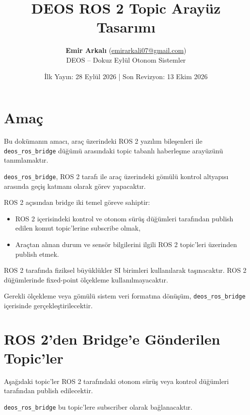 \documentclass[12pt,a4paper]{article}
\title{
    \textbf{DEOS ROS 2 Topic Arayüz Tasarımı}
}
\author{\textbf{Emir Arkalı} (\href{mailto:emirarkali07@gmail.com}{emirarkali07@gmail.com})\\DEOS -- Dokuz Eylül Otonom Sistemler}
\date{İlk Yayın: 28 Eylül 2026 \quad | \quad Son Revizyon: 13 Ekim 2026}
\begin{document}

\maketitle

\section{Amaç}

Bu dokümanın amacı, araç üzerindeki ROS 2 yazılım bileşenleri ile
\texttt{deos\_ros\_bridge} düğümü arasındaki topic tabanlı haberleşme
arayüzünü tanımlamaktır.

\texttt{deos\_ros\_bridge}, ROS 2 tarafı ile araç üzerindeki gömülü kontrol
altyapısı arasında geçiş katmanı olarak görev yapacaktır.

ROS 2 açısından bridge iki temel göreve sahiptir:

\begin{itemize}
    \item ROS 2 içerisindeki kontrol ve otonom sürüş düğümleri tarafından
    publish edilen komut topic'lerine subscribe olmak,
    
    \item Araçtan alınan durum ve sensör bilgilerini ilgili ROS 2 topic'leri
    üzerinden publish etmek.
\end{itemize}

ROS 2 tarafında fiziksel büyüklükler SI birimleri kullanılarak taşınacaktır.
ROS 2 düğümlerinde fixed-point ölçekleme kullanılmayacaktır.

Gerekli ölçekleme veya gömülü sistem veri formatına dönüşüm,
\texttt{deos\_ros\_bridge} içerisinde gerçekleştirilecektir.

\section{ROS 2'den Bridge'e Gönderilen Topic'ler}

Aşağıdaki topic'ler ROS 2 tarafındaki otonom sürüş veya kontrol düğümleri
tarafından publish edilecektir.

\texttt{deos\_ros\_bridge} bu topic'lere subscriber olarak bağlanacaktır.

\end{document}

